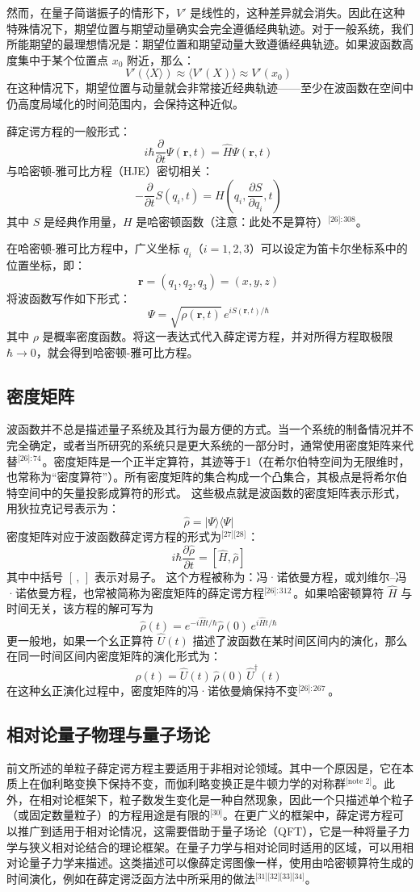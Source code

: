然而，在量子简谐振子的情形下，$V'$ 是线性的，这种差异就会消失。因此在这种特殊情况下，期望位置与期望动量确实会完全遵循经典轨迹。对于一般系统，我们所能期望的最理想情况是：期望位置和期望动量大致遵循经典轨迹。如果波函数高度集中于某个位置点 $x_0$ 附近，那么：
$$
V'\left( \langle X \rangle \right) \approx \langle V'(X) \rangle \approx V'(x_0)~
$$
在这种情况下，期望位置与动量就会非常接近经典轨迹——至少在波函数在空间中仍高度局域化的时间范围内，会保持这种近似。

薛定谔方程的一般形式：
$$
i\hbar \frac{\partial}{\partial t} \Psi(\mathbf{r}, t) = \hat{H} \Psi(\mathbf{r}, t)~
$$
与哈密顿-雅可比方程（HJE）密切相关：
$$
- \frac{\partial}{\partial t} S(q_i, t) = H\left(q_i, \frac{\partial S}{\partial q_i}, t\right)~
$$
其中 $S$ 是经典作用量，$H$ 是哈密顿函数（注意：此处不是算符）\(^\text{[26]: 308}\)。

在哈密顿-雅可比方程中，广义坐标 $q_i$（$i = 1, 2, 3$）可以设定为笛卡尔坐标系中的位置坐标，即：
$$
\mathbf{r} = (q_1, q_2, q_3) = (x, y, z)~
$$
将波函数写作如下形式：
$$
\Psi = \sqrt{\rho(\mathbf{r}, t)}\, e^{i S(\mathbf{r}, t) / \hbar}~
$$
其中 $\rho$ 是概率密度函数。将这一表达式代入薛定谔方程，并对所得方程取极限 $\hbar \to 0$，就会得到哈密顿-雅可比方程。
\subsection{密度矩阵}
波函数并不总是描述量子系统及其行为最方便的方式。当一个系统的制备情况并不完全确定，或者当所研究的系统只是更大系统的一部分时，通常使用密度矩阵来代替\(^\text{[26]: 74 }\)。密度矩阵是一个正半定算符，其迹等于1（在希尔伯特空间为无限维时，也常称为“密度算符”）。所有密度矩阵的集合构成一个凸集合，其极点是将希尔伯特空间中的矢量投影成算符的形式。
这些极点就是波函数的密度矩阵表示形式，用狄拉克记号表示为：
$$
\hat{\rho} = |\Psi\rangle \langle \Psi|~
$$
密度矩阵对应于波函数薛定谔方程的形式为\(^\text{[27][28] }\)：
$$
i\hbar \frac{\partial \hat{\rho}}{\partial t} = [\hat{H}, \hat{\rho}]~
$$
其中中括号 $[\, ,\,]$ 表示对易子。
这个方程被称为：冯·诺依曼方程，或刘维尔–冯·诺依曼方程，也常被简称为密度矩阵的薛定谔方程\(^\text{[26]: 312  }\)。如果哈密顿算符 $\hat{H}$ 与时间无关，该方程的解可写为
$$
\hat{\rho}(t) = e^{-i\hat{H}t/\hbar} \hat{\rho}(0)\, e^{i\hat{H}t/\hbar}~
$$
更一般地，如果一个幺正算符 $\hat{U}(t)$ 描述了波函数在某时间区间内的演化，那么在同一时间区间内密度矩阵的演化形式为：
$$
\hat{\rho}(t) = \hat{U}(t)\, \hat{\rho}(0)\, \hat{U}^\dagger(t)~
$$
在这种幺正演化过程中，密度矩阵的冯·诺依曼熵保持不变\(^\text{[26]: 267   }\)。
\subsection{相对论量子物理与量子场论}
前文所述的单粒子薛定谔方程主要适用于非相对论领域。其中一个原因是，它在本质上在伽利略变换下保持不变，而伽利略变换正是牛顿力学的对称群\(^\text{[note 2]}\)。此外，在相对论框架下，粒子数发生变化是一种自然现象，因此一个只描述单个粒子（或固定数量粒子）的方程用途是有限的\(^\text{[30]}\)。在更广义的框架中，薛定谔方程可以推广到适用于相对论情况，这需要借助于量子场论（QFT），它是一种将量子力学与狭义相对论结合的理论框架。在量子力学与相对论同时适用的区域，可以用相对论量子力学来描述。这类描述可以像薛定谔图像一样，使用由哈密顿算符生成的时间演化，例如在薛定谔泛函方法中所采用的做法\(^\text{[31][32][33][34]}\)。
